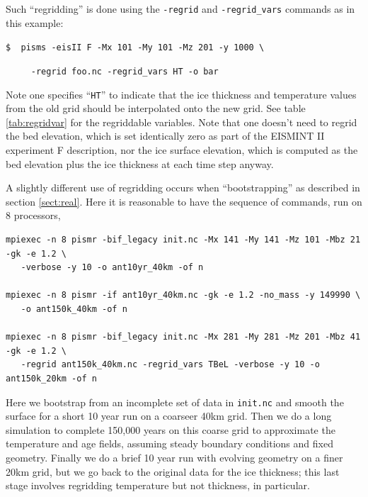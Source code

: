 \documentclass[11pt,final]{amsart}
\begin{document}
Such ``regridding'' is done using the \verb|-regrid| and \verb|-regrid_vars| commands as in this example:

\verb|$  pisms -eisII F -Mx 101 -My 101 -Mz 201 -y 1000 \|

\verb|     -regrid foo.nc -regrid_vars HT -o bar|

\noindent Note one specifies ``\verb|HT|'' to indicate that the ice thickness and temperature values from the old grid should be interpolated onto the new grid.  See table \ref{tab:regridvar} for the regriddable variables.  Note that one doesn't need to regrid the bed elevation, which is set identically zero as part of the EISMINT II experiment F description, nor the ice surface elevation, which is computed as the bed elevation plus the ice thickness at each time step anyway.

A slightly different use of regridding occurs when ``bootstrapping'' as described in section \ref{sect:real}.  Here it is reasonable to have the sequence of commands, run on 8 processors,
\small
\begin{verbatim}
mpiexec -n 8 pismr -bif_legacy init.nc -Mx 141 -My 141 -Mz 101 -Mbz 21 -gk -e 1.2 \
   -verbose -y 10 -o ant10yr_40km -of n

mpiexec -n 8 pismr -if ant10yr_40km.nc -gk -e 1.2 -no_mass -y 149990 \
   -o ant150k_40km -of n

mpiexec -n 8 pismr -bif_legacy init.nc -Mx 281 -My 281 -Mz 201 -Mbz 41 -gk -e 1.2 \
   -regrid ant150k_40km.nc -regrid_vars TBeL -verbose -y 10 -o ant150k_20km -of n
\end{verbatim}
\normalsize
Here we bootstrap from an incomplete set of data in \verb|init.nc| and smooth the surface for a short 10 year run on a coarseer 40km grid.  Then we do a long simulation to complete 150,000 years on this coarse grid to approximate the temperature and age fields, assuming steady boundary conditions and fixed geometry.  Finally we do a brief 10 year run with evolving geometry on a finer 20km grid, but we go back to the original data for the ice thickness; this last stage involves regridding temperature but not thickness, in particular.
\end{document}
